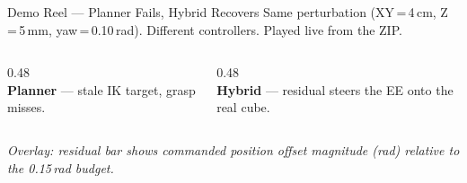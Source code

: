\documentclass[aspectratio=169, 10pt]{beamer}
\begin{document}
\begin{frame}{Demo Reel --- Planner Fails, Hybrid Recovers}
  \small
  Same perturbation (XY\,=\,4\,cm, Z\,=\,5\,mm, yaw\,=\,0.10\,rad).
  Different controllers. Played live from the ZIP.

  \vspace{0.3em}
  \begin{columns}[T]
    \begin{column}{0.48\textwidth}
      \centering
      \vspace{0.2em}\\
      \scriptsize \textbf{Planner} --- stale IK target, grasp misses.
    \end{column}
    \begin{column}{0.48\textwidth}
      \centering
      \vspace{0.2em}\\
      \scriptsize \textbf{Hybrid} --- residual steers the EE onto the real cube.
    \end{column}
  \end{columns}

  \vspace{0.3em}
  \scriptsize\textit{Overlay: residual bar shows commanded position offset
  magnitude (rad) relative to the 0.15\,rad budget.}
\end{frame}
\end{document}
